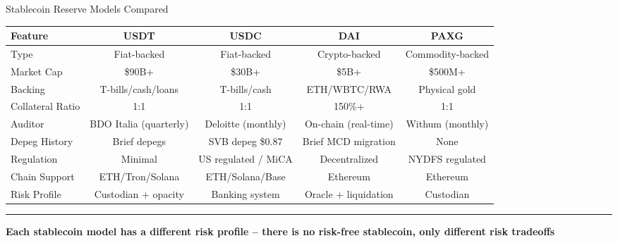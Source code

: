 \documentclass[8pt,aspectratio=169]{beamer}
\newcommand{\bottomnote}[1]{\vfill\vspace{-2mm}\textcolor{mllavender2}{\rule{\textwidth}{0.4pt}}\vspace{1mm}\footnotesize\textbf{#1}}
\begin{document}
\begin{frame}{Stablecoin Reserve Models Compared}
\vspace{-2mm}
\begin{adjustbox}{max width=\textwidth}
\begin{tabular}{@{}l>{\scriptsize}c>{\scriptsize}c>{\scriptsize}c>{\scriptsize}c@{}}
\toprule
\textbf{\footnotesize Feature} & \textbf{USDT} & \textbf{USDC} & \textbf{DAI} & \textbf{PAXG} \\
\midrule
Type & Fiat-backed & Fiat-backed & Crypto-backed & Commodity-backed \\
\addlinespace
Market Cap & \$90B+ & \$30B+ & \$5B+ & \$500M+ \\
\addlinespace
Backing & T-bills/cash/loans & T-bills/cash & ETH/WBTC/RWA & Physical gold \\
\addlinespace
Collateral Ratio & 1:1 & 1:1 & 150\%+ & 1:1 \\
\addlinespace
Auditor & BDO Italia (quarterly) & Deloitte (monthly) & On-chain (real-time) & Withum (monthly) \\
\addlinespace
Depeg History & Brief depegs & SVB depeg \$0.87 & Brief MCD migration & None \\
\addlinespace
Regulation & Minimal & US regulated / MiCA & Decentralized & NYDFS regulated \\
\addlinespace
Chain Support & ETH/Tron/Solana & ETH/Solana/Base & Ethereum & Ethereum \\
\addlinespace
Risk Profile & Custodian + opacity & Banking system & Oracle + liquidation & Custodian \\
\bottomrule
\end{tabular}
\end{adjustbox}
\vspace{2mm}
\centering
{}
\bottomnote{Each stablecoin model has a different risk profile -- there is no risk-free stablecoin, only different risk tradeoffs}
\end{frame}
\end{document}
